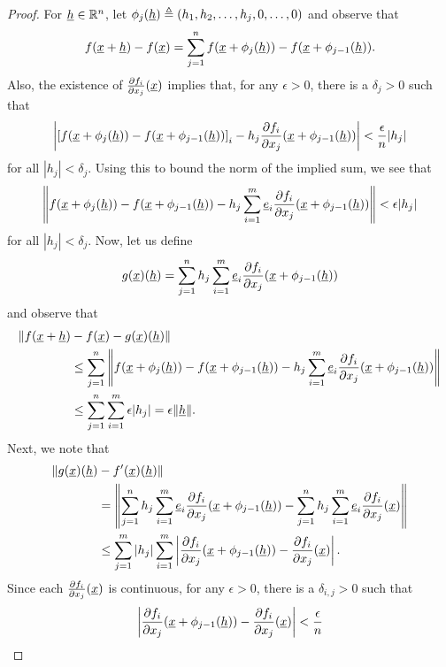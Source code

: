 \begin{proof}
For $\underline{h} \in \mathbb{R}^n$, let $\phi_j (\underline{h}) \triangleq (h_1,h_2,\ldots,h_j,0,\ldots,0)$ and observe that
\[ f(\underline{x}+\underline{h}) - f(\underline{x}) = \sum_{j=1}^n f(\underline{x}+\phi_j (\underline{h})) - f(\underline{x}+\phi_{j-1}(\underline{h})). \]
Also, the existence of $\frac{\partial f_i}{\partial x_j} (\underline{x})$ implies that, for any $\epsilon >0$, there is a $\delta_j > 0$ such that
\[  \left| \left[ f(\underline{x}+\phi_j (\underline{h})) - f(\underline{x}+\phi_{j-1}(\underline{h})) \right]_i  - h_j \frac{\partial f_i}{\partial x_j} (\underline{x}+\phi_{j-1}(\underline{h})) \right| < \frac{\epsilon}{n} |h_j| \]
for all $|h_j| < \delta_j$.
Using this to bound the norm of the implied sum, we see that
\[  \left\| f(\underline{x}+\phi_j (\underline{h})) - f(\underline{x}+\phi_{j-1}(\underline{h})) -  h_j \sum_{i=1}^m \underline{e}_i \frac{\partial f_i}{\partial x_j}  (\underline{x}+\phi_{j-1}(\underline{h})) \right\|  < \epsilon |h_j| \]
for all $|h_j| < \delta_j$.
Now, let us define
\[ g(\underline{x})(\underline{h}) = \sum_{j=1}^n h_j \sum_{i=1}^m \underline{e}_i \frac{\partial f_i}{\partial x_j} (\underline{x}+\phi_{j-1}(\underline{h})) \]
and observe that
\begin{align*}
\| f(\underline{x}+\underline{h}) & - f(\underline{x}) - g(\underline{x}) (\underline{h}) \|  \\
&\leq \sum_{j=1}^n \left\| f(\underline{x}+\phi_j (\underline{h})) - f(\underline{x}+\phi_{j-1}(\underline{h})) - h_j \sum_{i=1}^m \underline{e}_i \frac{\partial f_i}{\partial x_j} (\underline{x}+\phi_{j-1}(\underline{h})) \right\| \\
& \leq \sum_{j=1}^n \sum_{i=1}^m \epsilon |h_j| = \epsilon \| \underline{h} \|.
\end{align*}
Next, we note that
\begin{align*}
\| g(\underline{x})(\underline{h}) &- f'(\underline{x})(\underline{h}) \| \\
&= \left\| \sum_{j=1}^n h_j \sum_{i=1}^m \underline{e}_i \frac{\partial f_i}{\partial x_j} (\underline{x}+\phi_{j-1}(\underline{h})) - \sum_{j=1}^n h_j \sum_{i=1}^m \underline{e}_i \frac{\partial f_i}{\partial x_j} (\underline{x}) \right\| \\
&\leq \sum_{j=1}^m |h_j| \sum_{i=1}^m \left| \frac{\partial f_i}{\partial x_j} (\underline{x}+\phi_{j-1}(\underline{h})) - \frac{\partial f_i}{\partial x_j} (\underline{x}) \right|.
\end{align*}
Since each $\frac{\partial f_i}{\partial x_j} (\underline{x})$ is continuous, for any $\epsilon>0$, there is a $\delta_{i,j}>0$ such that
\[ \left| \frac{\partial f_i}{\partial x_j} (\underline{x}+\phi_{j-1}(\underline{h})) - \frac{\partial f_i}{\partial x_j} (\underline{x}) \right| < \frac{\epsilon}{n} \]

\end{proof}
